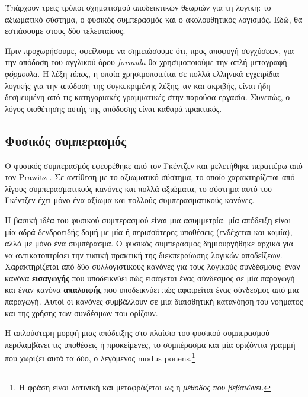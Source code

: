 \documentclass [a4paper,11pt] {book}
\theoremstyle{definition}
\theoremstyle{definition}
\newenvironment{note}[1][Σημείωση]{\begin{trivlist}
\item[\hskip \labelsep {\bfseries #1}]}{\end{trivlist}}
\begin{document}
Υπάρχουν τρεις τρόποι σχηματισμού αποδεικτικών θεωριών για τη λογική: το αξιωματικό σύστημα, ο φυσικός συμπερασμός και ο ακολουθητικός λογισμός. Εδώ, θα εστιάσουμε στους δύο τελευταίους.
\begin{note}
Πριν προχωρήσουμε, οφείλουμε να σημειώσουμε ότι, προς αποφυγή συγχύσεων, για την απόδοση του αγγλικού όρου \textit{formula} θα χρησιμοποιούμε την απλή μεταγραφή \textit{φόρμουλα}. Η λέξη \textit{τύπος}, η οποία χρησιμοποιείται σε πολλά ελληνικά εγχειρίδια λογικής για την απόδοση της συγκεκριμένης λέξης, αν και ακριβής, είναι ήδη δεσμευμένη από τις κατηγοριακές γραμματικές στην παρούσα εργασία. Συνεπώς, ο λόγος υιοθέτησης αυτής της απόδοσης είναι καθαρά πρακτικός.
\end{note}
\subsection{Φυσικός συμπερασμός}
Ο φυσικός συμπερασμός εφευρέθηκε από τον Γκέντζεν \citep{citeulike:869771} και μελετήθηκε περαιτέρω από τον Prawitz \citep{prawitz2006natural}. Σε αντίθεση με το αξιωματικό σύστημα, το οποίο χαρακτηρίζεται από λίγους συμπερασματικούς κανόνες και πολλά αξιώματα, το σύστημα αυτό του Γκέντζεν έχει μόνο ένα αξίωμα και πολλούς συμπερασματικούς κανόνες.


Η βασική ιδέα του φυσικού συμπερασμού είναι μια ασυμμετρία: μία απόδειξη είναι μία αδρά δενδροειδής δομή με μία ή περισσότερες υποθέσεις (ενδέχεται και καμία), αλλά με μόνο ένα συμπέρασμα. Ο φυσικός συμπερασμός δημιουργήθηκε αρχικά για να αντικατοπτρίσει την τυπική πρακτική της διεκπεραίωσης λογικών αποδείξεων. Χαρακτηρίζεται από δύο συλλογιστικούς κανόνες για τους λογικούς συνδέσμους: έναν κανόνα \textbf{εισαγωγής} που υποδεικνύει πώς εισάγεται ένας σύνδεσμος σε μία παραγωγή και έναν κανόνα \textbf{απαλοιφής} που υποδεικνύει πώς αφαιρείται ένας σύνδεσμος από μια παραγωγή. Αυτοί οι κανόνες συμβάλλουν σε μία διαισθητική κατανόηση του νοήματος και της χρήσης των συνδέσμων που ορίζουν.

Η απλούστερη μορφή μιας απόδειξης στο πλαίσιο του φυσικού συμπερασμού περιλαμβάνει τις υποθέσεις ή προκείμενες, το συμπέρασμα και μία οριζόντια γραμμή που χωρίζει αυτά τα δύο, ο λεγόμενος modus ponens.\footnote{Η φράση είναι λατινική και μεταφράζεται ως η \textit{μέθοδος που βεβαιώνει}.}
\end{document}
